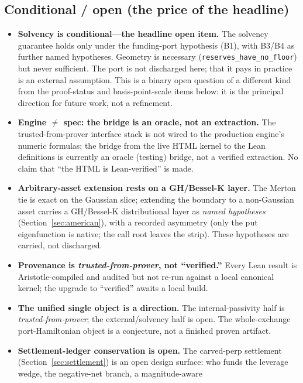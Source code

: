 \documentclass[11pt]{article}
\newcommand{\tfp}{\emph{trusted-from-prover}}
\begin{document}
\subsection{Conditional / open (the price of the headline)}
\begin{itemize}[leftmargin=2em]
  \item \textbf{Solvency is conditional---the headline open item.} The solvency
        guarantee holds only under the funding-port hypothesis (B1), with B3/B4 as
        further named hypotheses. Geometry is necessary
        (\texttt{reserves\_have\_no\_floor}) but never sufficient. The port is not
        discharged here; that it pays in practice is an external assumption. This
        is a binary open question of a different kind from the proof-status and
        basis-point-scale items below: it is the principal direction for future
        work, not a refinement.
  \item \textbf{Engine $\neq$ spec: the bridge is an oracle, not an extraction.}
        The trusted-from-prover interface stack is not wired to the production
        engine's numeric formulas; the bridge from the live HTML kernel to the Lean
        definitions is currently an oracle (testing) bridge, not a verified
        extraction. No claim that ``the HTML is Lean-verified'' is made.
  \item \textbf{Arbitrary-asset extension rests on a GH/Bessel-K layer.} The
        Merton tie is exact on the Gaussian slice; extending the boundary to a
        non-Gaussian asset carries a GH/Bessel-K distributional layer as
        \emph{named hypotheses} (Section~\ref{sec:american}), with a recorded
        asymmetry (only the put eigenfunction is native; the call root leaves the
        strip). These hypotheses are carried, not discharged.
  \item \textbf{Provenance is \tfp{}, not ``verified.''} Every Lean result is
        Aristotle-compiled and audited but not re-run against a local canonical
        kernel; the upgrade to ``verified'' awaits a local build.
  \item \textbf{The unified single object is a direction.} The internal-passivity
        half is \tfp{}; the external/solvency half is open. The whole-exchange
        port-Hamiltonian object is a conjecture, not a finished proven artifact.
  \item \textbf{Settlement-ledger conservation is open.} The carved-perp
        settlement (Section~\ref{sec:settlement}) is an open design surface: who
        funds the leverage wedge, the negative-net branch, a magnitude-aware

\end{itemize}
\end{document}

